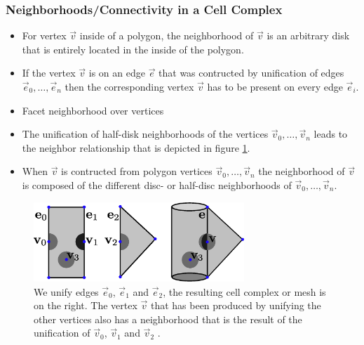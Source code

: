 \begin{frame}
  \frametitle{Neighborhoods/Connectivity in a Cell Complex}
		\begin{itemize}
			\item For vertex $\vec{v}$ inside of a polygon, the neighborhood of $\vec{v}$ is an arbitrary disk that is entirely located in the inside 
of the polygon. 
			\item If the vertex $\vec{v}$ is on an edge $\vec{e}$ that was contructed by unification of edges $\vec{e}_0,\dots,\vec{e}_n$ then the corresponding vertex $\vec{v}$ has to be present on every edge $\vec{e}_i$.
			\item Facet neighborhood over vertices
			\item The unification of half-disk neighborhoods of the vertices $\vec{v}_0,\dots,\vec{v}_n$ leads to the neighbor relationship that is
depicted in figure \ref{fig:mesh-neighborhood}.
			\item When $\vec{v}$ is contructed from polygon vertices $\vec{v}_0,\dots,\vec{v}_n$ the neighborhood of $\vec{v}$ is composed of the different disc- or half-disc neighborhoods of $\vec{v}_0,\dots, \vec{v}_n$.  
		\end{itemize}					 
\begin{figure}[h!]
\begin{center}
\includegraphics[height=3cm]{screenshots/neighborhood.eps}
\end{center}
\caption{We unify edges $\vec{e}_0$, $\vec{e}_1$ and $\vec{e}_2$, the resulting cell complex or mesh is on the right. The vertex $\vec{v}$ that has been produced by
unifying the other vertices also has a neighborhood that is the result of the unification of $\vec{v}_0$, $\vec{v}_1$ and $\vec{v}_2$ \cite{kinsey1993topology}.}
\label{fig:mesh-neighborhood}
\end{figure}

\end{frame}

